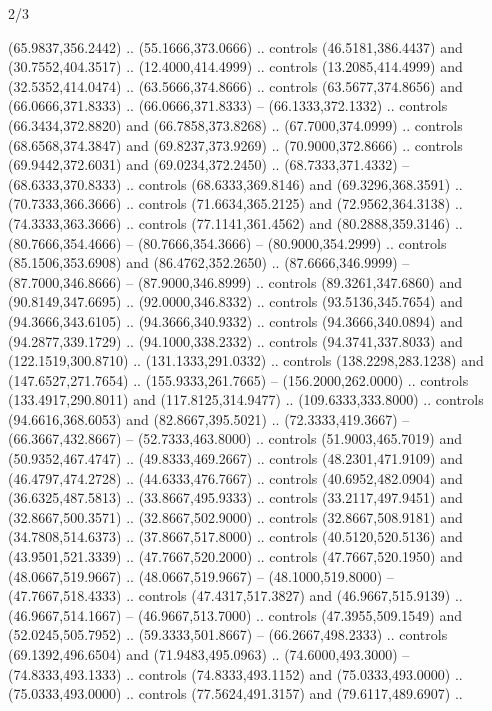 \begin{flagdescription}{2/3}
\begin{scope}[xshift=0.5\flaglength,yshift=0.5\flagwidth,scale=\flagwidth/525.28]
\begin{scope}[y=0.1mm, x=0.1mm, yscale=-1,shift={(-381.5,-404)}]
\begin{scope}[shift={(5.25001,4.53053)},miter limit=4.00,line width=0.800\lw]
  (65.9837,356.2442) .. (55.1666,373.0666) .. controls (46.5181,386.4437) and
  (30.7552,404.3517) .. (12.4000,414.4999) .. controls (13.2085,414.4999) and
  (32.5352,414.0474) .. (63.5666,374.8666) .. controls (63.5677,374.8656) and
  (66.0666,371.8333) .. (66.0666,371.8333) -- (66.1333,372.1332) .. controls
  (66.3434,372.8820) and (66.7858,373.8268) .. (67.7000,374.0999) .. controls
  (68.6568,374.3847) and (69.8237,373.9269) .. (70.9000,372.8666) .. controls
  (69.9442,372.6031) and (69.0234,372.2450) .. (68.7333,371.4332) --
  (68.6333,370.8333) .. controls (68.6333,369.8146) and (69.3296,368.3591) ..
  (70.7333,366.3666) .. controls (71.6634,365.2125) and (72.9562,364.3138) ..
  (74.3333,363.3666) .. controls (77.1141,361.4562) and (80.2888,359.3146) ..
  (80.7666,354.4666) -- (80.7666,354.3666) -- (80.9000,354.2999) .. controls
  (85.1506,353.6908) and (86.4762,352.2650) .. (87.6666,346.9999) --
  (87.7000,346.8666) -- (87.9000,346.8999) .. controls (89.3261,347.6860) and
  (90.8149,347.6695) .. (92.0000,346.8332) .. controls (93.5136,345.7654) and
  (94.3666,343.6105) .. (94.3666,340.9332) .. controls (94.3666,340.0894) and
  (94.2877,339.1729) .. (94.1000,338.2332) .. controls (94.3741,337.8033) and
  (122.1519,300.8710) .. (131.1333,291.0332) .. controls (138.2298,283.1238) and
  (147.6527,271.7654) .. (155.9333,261.7665) -- (156.2000,262.0000) .. controls
  (133.4917,290.8011) and (117.8125,314.9477) .. (109.6333,333.8000) .. controls
  (94.6616,368.6053) and (82.8667,395.5021) .. (72.3333,419.3667) --
  (66.3667,432.8667) -- (52.7333,463.8000) .. controls (51.9003,465.7019) and
  (50.9352,467.4747) .. (49.8333,469.2667) .. controls (48.2301,471.9109) and
  (46.4797,474.2728) .. (44.6333,476.7667) .. controls (40.6952,482.0904) and
  (36.6325,487.5813) .. (33.8667,495.9333) .. controls (33.2117,497.9451) and
  (32.8667,500.3571) .. (32.8667,502.9000) .. controls (32.8667,508.9181) and
  (34.7808,514.6373) .. (37.8667,517.8000) .. controls (40.5120,520.5136) and
  (43.9501,521.3339) .. (47.7667,520.2000) .. controls (47.7667,520.1950) and
  (48.0667,519.9667) .. (48.0667,519.9667) -- (48.1000,519.8000) --
  (47.7667,518.4333) .. controls (47.4317,517.3827) and (46.9667,515.9139) ..
  (46.9667,514.1667) -- (46.9667,513.7000) .. controls (47.3955,509.1549) and
  (52.0245,505.7952) .. (59.3333,501.8667) -- (66.2667,498.2333) .. controls
  (69.1392,496.6504) and (71.9483,495.0963) .. (74.6000,493.3000) --
  (74.8333,493.1333) .. controls (74.8333,493.1152) and (75.0333,493.0000) ..
  (75.0333,493.0000) .. controls (77.5624,491.3157) and (79.6117,489.6907) ..

\end{scope}
\end{scope}
\end{scope}
\end{flagdescription}

